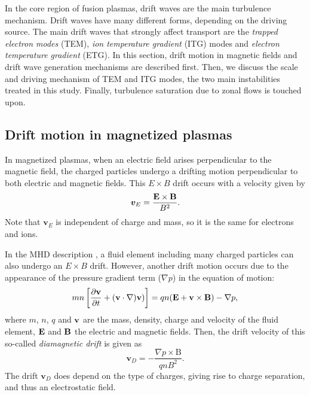 In the core region of fusion plasmas, drift waves are the main turbulence mechanism. Drift waves have many different forms, depending on the driving source. The main drift waves that strongly affect transport are the \emph{trapped electron modes} (TEM), \emph{ion temperature gradient} (ITG) modes and \emph{electron temperature gradient} (ETG). In this section, drift motion in magnetic fields and drift wave generation mechanisms are described first. Then, we discuss the scale and driving mechanism of TEM and ITG modes, the two main instabilities treated in this study. Finally, turbulence saturation due to zonal flows is touched upon.


\subsection{Drift motion in magnetized plasmas}

In magnetized plasmas, when an electric field arises perpendicular to the magnetic field, the charged particles undergo a drifting motion perpendicular to both electric and magnetic fields. This $E\times B$ drift occurs with a velocity given by%
\begin{equation}
\boldsymbol{v}_E = \frac{\boldsymbol{\mathrm{E}} \times \boldsymbol{\mathrm{B}}}{B^2}.
\end{equation}
\noindent Note that $\boldsymbol{v}_E$ is independent of charge and mass, so it is the same for electrons and ions.

In the MHD description \cite{Freidberg_2007_Plasma,Bittencourt_2004_Plasma,Goldston_1995_Plasma}, a fluid element including many charged particles can also undergo an $E\times B$ drift. However, another drift motion occurs due to the appearance of the pressure gradient term ($\nabla p$) in the equation of motion:%
\begin{equation}
mn\left[ \frac{\partial \boldsymbol{\mathrm{v}}}{\partial t} + (\boldsymbol{\mathrm{v}} \cdot \nabla)\boldsymbol{\mathrm{v}}) \right] = qn(\boldsymbol{\mathrm{E}} + \boldsymbol{\mathrm{v}} \times \boldsymbol{\mathrm{B}}) - \nabla p,
\end{equation}
\noindent where $m$, $n$, $q$ and $\boldsymbol{\mathrm{v}}$ are the mass, density, charge and velocity of the fluid element, $\boldsymbol{\mathrm{E}}$ and $\boldsymbol{\mathrm{B}}$ the electric and magnetic fields. Then, the drift velocity of this so-called \emph{diamagnetic drift} is given as %
\begin{equation}
  \boldsymbol{v}_D = -\frac{\nabla p \times \boldsymbol{\mathrm{B}}}{qnB^2}.
\end{equation}
\noindent The drift $\boldsymbol{v}_D$ does depend on the type of charges, giving rise to charge separation, and thus an electrostatic field.


